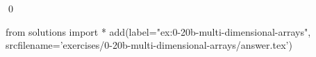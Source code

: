 
\begin{ex} 
  \label{ex:0-20b-multi-dimensional-arrays}
  
  \qed
\end{ex} 
\begin{python0}
from solutions import *
add(label="ex:0-20b-multi-dimensional-arrays",
    srcfilename='exercises/0-20b-multi-dimensional-arrays/answer.tex') 
\end{python0}
